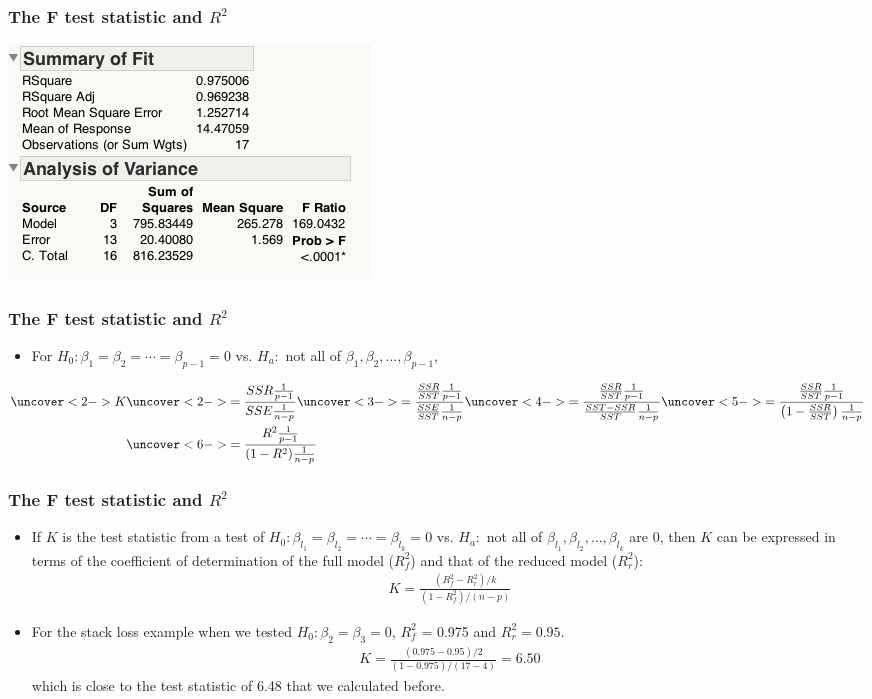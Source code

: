 \documentclass[handout]{beamer}\usepackage[]{graphicx}\usepackage[]{color}
\numberwithin{equation}{section}
\begin{document}
\begin{frame}
\frametitle{The F test statistic and $R^2$}
\begin{center}
 \includegraphics{../../fig/rsqf1.png}
\end{center}
\end{frame}

\begin{frame}
\frametitle{The F test statistic and $R^2$}
\begin{itemize}
\item For $H_0: \beta_1 = \beta_2 = \cdots = \beta_{p - 1} = 0$ vs. $H_a:$ not all of $\beta_1, \beta_2, \ldots, \beta_{p-1}$,
\end{itemize}
\begin{align*}
\uncover<2->{K} & \uncover<2->{= \frac{SSR \frac{1}{p-1}}{SSE\frac{1}{n-p}}} \uncover<3->{ = \frac{\frac{SSR}{SST} \frac{1}{p-1}}{\frac{SSE}{SST}\frac{1}{n-p}}} \uncover<4->{ = \frac{\frac{SSR}{SST} \frac{1}{p-1}}{\frac{SST - SSR}{SST}\frac{1}{n-p}}} \uncover<5->{ = \frac{\frac{SSR}{SST} \frac{1}{p-1}}{\left ( 1 - \frac{SSR}{SST} \right ) \frac{1}{n-p}}} \\
&\uncover<6->{= \frac{R^2 \frac{1}{p-1}}{(1- R^2) \frac{1}{n-p}}}
\end{align*}
\end{frame}

\begin{frame}
\frametitle{The F test statistic and $R^2$}
\begin{itemize}
\item If $K$ is the test statistic from a test of $H_0: \beta_{l_1} = \beta_{l_2} = \cdots = \beta_{l_k} = 0$ vs. $H_a:$ not all of $\beta_{l_1}, \beta_{l_2}, \ldots, \beta_{l_k}$ are 0, then $K$ can be expressed in terms of the coefficient of determination of the full model ($R^2_f$) and that of the reduced model ($R^2_r$):
\pause \begin{align*}
K = \frac{(R^2_f - R^2_r)/k}{(1-R_f^2)/(n - p)}
\end{align*}
\pause \item For the stack loss example when we tested $H_0: \beta_2 = \beta_3 = 0$, $R_f^2$ = 0.975 and $R^2_r = 0.95$.
\pause \begin{align*}
K = \frac{(0.975  - 0.95)/ 2}{(1-0.975)/(17-4)} = 6.50
\end{align*}
which is close to the test statistic of 6.48 that we calculated before.
\end{itemize}
\end{frame}
\end{document}
